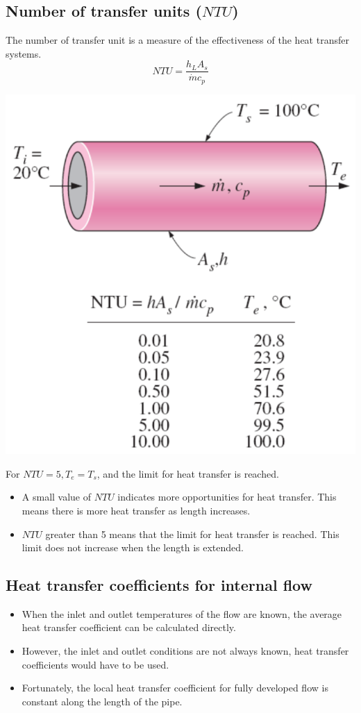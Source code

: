 \documentclass[11pt]{article}
\begin{document}
 \newpage
\subsection{Number of transfer units (\(NTU\))}
\label{sec:org9a6c231}
The number of transfer unit is a measure of the effectiveness of the heat transfer systems.
\[NTU = \frac{h_L A_s}{\dot{m} c_p}\]
\begin{center}
\includegraphics[width=.9\linewidth]{./images/number-of-transfer-units-diagram.png}
\end{center}

For \(NTU = 5, T_e = T_s\), and the limit for heat transfer is reached.
\begin{itemize}
\item A small value of \(NTU\) indicates more opportunities for heat transfer. This means there is more heat transfer as length increases.
\item \(NTU\) greater than 5 means that the limit for heat transfer is reached. This limit does not increase when the length is extended.
\end{itemize}
\subsection{Heat transfer coefficients for internal flow}
\label{sec:orgf8a6057}
\begin{itemize}
\item When the inlet and outlet temperatures of the flow are known, the average heat transfer coefficient can be calculated directly.
\item However, the inlet and outlet conditions are not always known, heat transfer coefficients would have to be used.
\item Fortunately, the local heat transfer coefficient for fully developed flow is constant along the length of the pipe.
\end{itemize}
\end{document}
